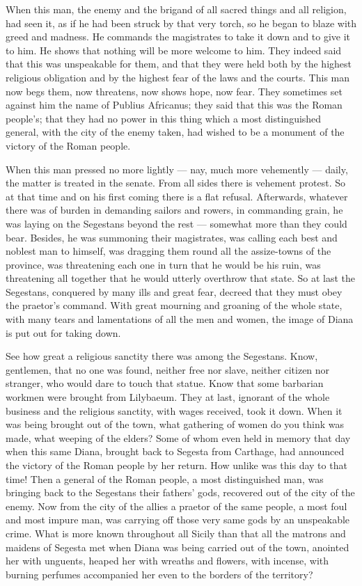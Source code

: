  When this man, the enemy and the brigand of all sacred things and all religion, had seen it, as if he had been struck by that very torch, so he began to blaze with greed and madness. He commands the magistrates to take it down and to give it to him. He shows that nothing will be more welcome to him. They indeed said that this was unspeakable for them, and that they were held both by the highest religious obligation and by the highest fear of the laws and the courts. This man now begs them, now threatens, now shows hope, now fear. They sometimes set against him the name of Publius Africanus; they said that this was the Roman people's; that they had no power in this thing which a most distinguished general, with the city of the enemy taken, had wished to be a monument of the victory of the Roman people.

 When this man pressed no more lightly --- nay, much more vehemently --- daily, the matter is treated in the senate. From all sides there is vehement protest. So at that time and on his first coming there is a flat refusal. Afterwards, whatever there was of burden in demanding sailors and rowers, in commanding grain, he was laying on the Segestans beyond the rest --- somewhat more than they could bear. Besides, he was summoning their magistrates, was calling each best and noblest man to himself, was dragging them round all the assize-towns of the province, was threatening each one in turn that he would be his ruin, was threatening all together that he would utterly overthrow that state. So at last the Segestans, conquered by many ills and great fear, decreed that they must obey the praetor's command. With great mourning and groaning of the whole state, with many tears and lamentations of all the men and women, the image of Diana is put out for taking down.

 See how great a religious sanctity there was among the Segestans. Know, gentlemen, that no one was found, neither free nor slave, neither citizen nor stranger, who would dare to touch that statue. Know that some barbarian workmen were brought from Lilybaeum. They at last, ignorant of the whole business and the religious sanctity, with wages received, took it down. When it was being brought out of the town, what gathering of women do you think was made, what weeping of the elders? Some of whom even held in memory that day when this same Diana, brought back to Segesta from Carthage, had announced the victory of the Roman people by her return. How unlike was this day to that time! Then a general of the Roman people, a most distinguished man, was bringing back to the Segestans their fathers' gods, recovered out of the city of the enemy. Now from the city of the allies a praetor of the same people, a most foul and most impure man, was carrying off those very same gods by an unspeakable crime. What is more known throughout all Sicily than that all the matrons and maidens of Segesta met when Diana was being carried out of the town, anointed her with unguents, heaped her with wreaths and flowers, with incense, with burning perfumes accompanied her even to the borders of the territory?

